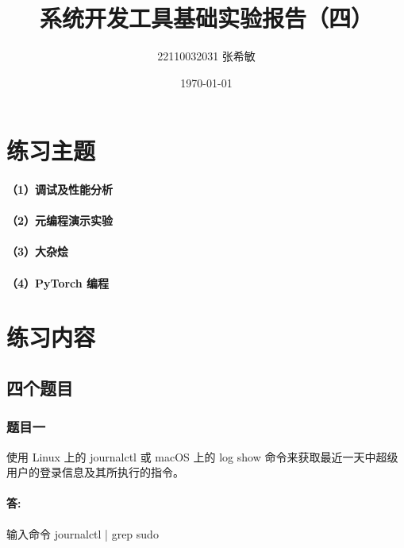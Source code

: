 \documentclass[a4paper, 12pt]{article}
\begin{document}
	\title{系统开发工具基础实验报告（四）}
	\author{22110032031 张希敏}
	\date{\today}
	\maketitle
	
	\tableofcontents
	\newpage
	
	\section{练习主题}
	\paragraph{（1）调试及性能分析}
	
	\paragraph{（2）元编程演示实验}
	
	\paragraph{（3）大杂烩}
	
	\paragraph{（4）PyTorch 编程}
	
	\section{练习内容}
	
	\subsection{四个题目}
	
	\subsubsection{题目一}
	使用 Linux 上的 journalctl 或 macOS 上的 log show 命令来获取最近一天中超级用户的登录信息及其所执行的指令。
	
	\paragraph{答:}
	输入命令 journalctl | grep sudo
	
\end{document}
